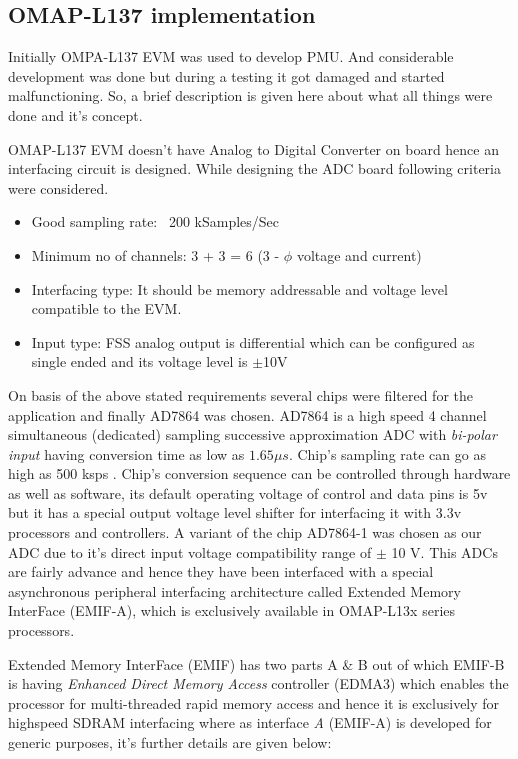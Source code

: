 \begin{appendix}
\chapter{OMAP-L137 implementation}
Initially OMPA-L137 EVM was used to develop PMU. And considerable development was done but during a testing it got damaged and started malfunctioning. So, a brief description is given here about what all things were done and it's concept.

 OMAP-L137 EVM doesn't have Analog to Digital Converter on board hence an interfacing circuit is designed. While designing the ADC board following criteria were considered.
\begin{itemize}
	\item Good sampling rate: ~200 kSamples/Sec
	\item Minimum no of channels: 3 + 3 = 6 (3 - $\phi$ voltage and current) 
	\item Interfacing type: It should be memory addressable and voltage level compatible  to the EVM.
	\item Input type: FSS analog output is differential which can be configured as single ended and its voltage level is $\pm$10V
\end{itemize}
  
On basis of the above stated requirements several chips were filtered for the application and finally AD7864 was chosen. AD7864 is a high speed 4 channel simultaneous (dedicated) sampling successive approximation ADC with \textit{bi-polar input} having conversion time as low as $1.65 \mu s$. Chip's sampling rate can go as high as 500 ksps \cite{uguide:adc}. Chip's conversion sequence can be controlled through hardware as well as software, its default operating voltage of control and data pins is 5v but it has a special output voltage level shifter for interfacing it with 3.3v processors and controllers. A variant of the chip AD7864-1 was chosen as our ADC due to it's direct input voltage compatibility range of $\pm$ 10 V. This ADCs are fairly advance and hence they have been interfaced with a special asynchronous peripheral interfacing architecture called Extended Memory InterFace (EMIF-A), which is exclusively available in OMAP-L13x series processors.

 Extended Memory InterFace (EMIF) has two parts A \& B out of which EMIF-B is having \textit{Enhanced Direct Memory Access} controller (EDMA3) which enables the processor for multi-threaded rapid memory access and hence it is exclusively for highspeed SDRAM interfacing where as interface \textit{A} (EMIF-A) is developed for generic purposes, it's further details are given below:


\end{appendix}
